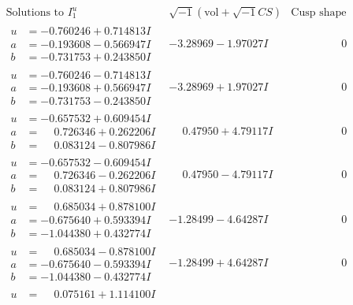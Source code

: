 \documentclass[1p]{elsarticle_modified}
\theoremstyle{definition}
\newcommand{\I}{\sqrt{-1}}
\begin{document}
$$\begin{array}{c|c|c}  
\text{Solutions to }I^u_{1}& \I (\text{vol} + \sqrt{-1}CS) & \text{Cusp shape}\\
 \hline 
\begin{aligned}
u &= -0.760246 + 0.714813 I \\
a &= -0.193608 - 0.566947 I \\
b &= -0.731753 + 0.243850 I\end{aligned}
 & -3.28969 - 1.97027 I & \phantom{-0.000000 } 0 \\ \hline\begin{aligned}
u &= -0.760246 - 0.714813 I \\
a &= -0.193608 + 0.566947 I \\
b &= -0.731753 - 0.243850 I\end{aligned}
 & -3.28969 + 1.97027 I & \phantom{-0.000000 } 0 \\ \hline\begin{aligned}
u &= -0.657532 + 0.609454 I \\
a &= \phantom{-}0.726346 + 0.262206 I \\
b &= \phantom{-}0.083124 - 0.807986 I\end{aligned}
 & \phantom{-}0.47950 + 4.79117 I & \phantom{-0.000000 } 0 \\ \hline\begin{aligned}
u &= -0.657532 - 0.609454 I \\
a &= \phantom{-}0.726346 - 0.262206 I \\
b &= \phantom{-}0.083124 + 0.807986 I\end{aligned}
 & \phantom{-}0.47950 - 4.79117 I & \phantom{-0.000000 } 0 \\ \hline\begin{aligned}
u &= \phantom{-}0.685034 + 0.878100 I \\
a &= -0.675640 + 0.593394 I \\
b &= -1.044380 + 0.432774 I\end{aligned}
 & -1.28499 - 4.64287 I & \phantom{-0.000000 } 0 \\ \hline\begin{aligned}
u &= \phantom{-}0.685034 - 0.878100 I \\
a &= -0.675640 - 0.593394 I \\
b &= -1.044380 - 0.432774 I\end{aligned}
 & -1.28499 + 4.64287 I & \phantom{-0.000000 } 0 \\ \hline\begin{aligned}
u &= \phantom{-}0.075161 + 1.114100 I \\

\end{aligned}
\end{array}$$
\end{document}
